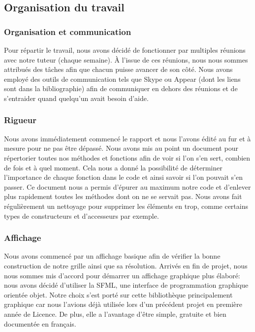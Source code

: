 \documentclass[french]{article}
\begin{document}
    \subsection{\Large Organisation du travail}
        \subsubsection{Organisation et communication}
        \hspace{0.5cm} Pour répartir le travail, nous avons décidé de fonctionner par multiples réunions avec notre tuteur (chaque semaine). À l'issue de ces réunions, nous nous sommes attribués des tâches afin que chacun puisse avancer de son côté. Nous avons employé des outils de communication tels que Skype ou Appear (dont les liens sont dans la bibliographie) afin de communiquer en dehors des réunions et de s'entraider quand quelqu'un avait besoin d'aide.\newline
        \subsubsection{ Rigueur}
        \hspace{0.5cm} Nous avons immédiatement commencé le rapport et nous l'avons édité au fur et à mesure pour ne pas être dépassé. 
        Nous avons mis au point un document pour répertorier toutes nos méthodes et fonctions afin de voir si l'on s'en sert, combien de fois et à quel moment. Cela nous a donné la possibilité de déterminer l'importance de chaque fonction dans le code et ainsi savoir si l'on pouvait s'en passer. Ce document nous a permis d'épurer au maximum notre code et d'enlever plus rapidement toutes les méthodes dont on ne se servait pas. Nous avons fait régulièrement un nettoyage pour supprimer les éléments en trop, comme certains types de constructeurs  et d'accesseurs par exemple.
        \subsubsection{Affichage}
        \hspace{0.5cm} Nous avons commencé par un affichage basique afin de vérifier la bonne construction de notre grille ainsi que sa résolution. 
        Arrivés en fin de projet, nous nous sommes mis d'accord pour démarrer un affichage graphique plus élaboré: nous avons décidé d'utiliser la SFML, une interface de programmation graphique orientée objet. Notre choix s'est porté sur cette bibliothèque principalement graphique car nous l'avions déjà utilisée lors d'un précédent projet en première année de Licence.  De plus, elle a l'avantage d'être simple, gratuite et bien documentée en français.
    
\end{document}
